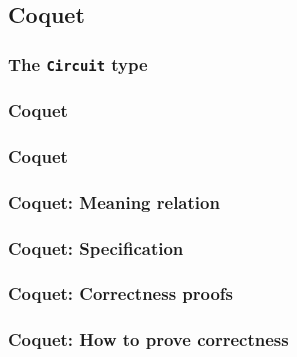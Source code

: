 \documentclass{beamer}
\begin{document}


        \subsection{Coquet}
        \label{subsec:coquet}
            \begin{frame}
                \frametitle{The \texttt{Circuit} type}
            \end{frame}

            \begin{frame}
                \frametitle{Coquet}
            \end{frame}

            \begin{frame}
                \frametitle{Coquet}
            \end{frame}

            \begin{frame}
                \frametitle{Coquet: Meaning relation}
            \end{frame}

            \begin{frame}
                \frametitle{Coquet: Specification}
            \end{frame}

            \begin{frame}
                \frametitle{Coquet: Correctness proofs}
            \end{frame}

            \begin{frame}
                \frametitle{Coquet: How to prove correctness}
            \end{frame}
\end{document}
